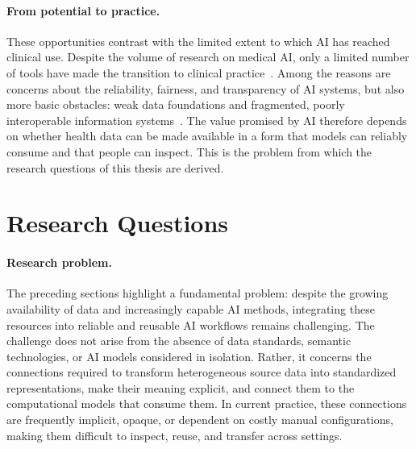 \paragraph{From potential to practice.}
These opportunities contrast with the limited extent to which AI has reached clinical use. Despite the volume of research on medical AI, only a limited number of tools have made the transition to clinical practice~\cite{lekadir_future-ai_2025}. Among the reasons are concerns about the reliability, fairness, and transparency of AI systems, but also more basic obstacles: weak data foundations and fragmented, poorly interoperable information systems~\cite{oecd_collective_2024,oecd_interoperability_2026}. The value promised by AI therefore depends on whether health data can be made available in a form that models can reliably consume and that people can inspect. This is the problem from which the research questions of this thesis are derived.

\section{Research Questions}
\label{sec:research_questions}

\paragraph{Research problem.}
The preceding sections highlight a fundamental problem: despite the growing availability of data and increasingly capable AI methods, integrating these resources into reliable and reusable AI workflows remains challenging. The challenge does not arise from the absence of data standards, semantic technologies, or AI models considered in isolation. Rather, it concerns the connections required to transform heterogeneous source data into standardized representations, make their meaning explicit, and connect them to the computational models that consume them. In current practice, these connections are frequently implicit, opaque, or dependent on costly manual configurations, making them difficult to inspect, reuse, and transfer across settings.

